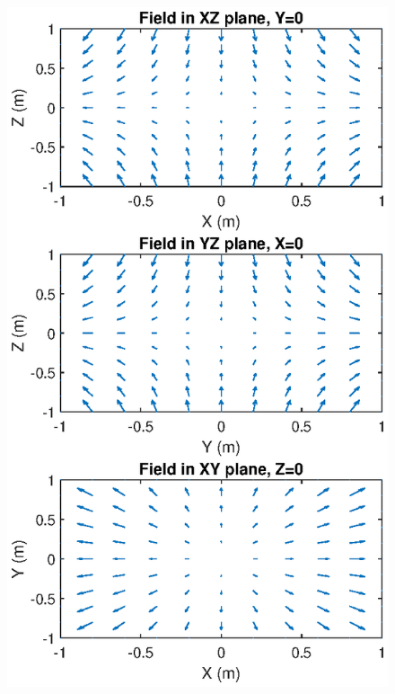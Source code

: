 \documentclass{article}
\theoremstyle{definition}
\begin{document}
\begin{figure}[!htb]
	\centering
	\begin{minipage}{.33\textwidth}
		\centering
		\includegraphics[width=\linewidth]{sim-figs/quad-1.eps}
	\end{minipage}%
	\begin{minipage}{.33\textwidth}
		\centering

\end{minipage}
\end{figure}
\end{document}

